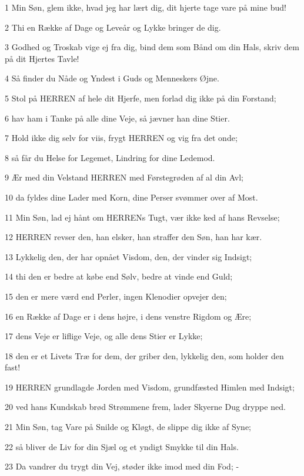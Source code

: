 \par 1 Min Søn, glem ikke, hvad jeg har lært dig, dit hjerte tage vare på mine bud!
\par 2 Thi en Række af Dage og Leveår og Lykke bringer de dig.
\par 3 Godhed og Troskab vige ej fra dig, bind dem som Bånd om din Hals, skriv dem på dit Hjertes Tavle!
\par 4 Så finder du Nåde og Yndest i Guds og Menneskers Øjne.
\par 5 Stol på HERREN af hele dit Hjerfe, men forlad dig ikke på din Forstand;
\par 6 hav ham i Tanke på alle dine Veje, så jævner han dine Stier.
\par 7 Hold ikke dig selv for viis, frygt HERREN og vig fra det onde;
\par 8 så får du Helse for Legemet, Lindring for dine Ledemod.
\par 9 Ær med din Velstand HERREN med Førstegrøden af al din Avl;
\par 10 da fyldes dine Lader med Korn, dine Perser svømmer over af Most.
\par 11 Min Søn, lad ej hånt om HERRENs Tugt, vær ikke ked af hans Revselse;
\par 12 HERREN revser den, han elsker, han straffer den Søn, han har kær.
\par 13 Lykkelig den, der har opnået Visdom, den, der vinder sig Indsigt;
\par 14 thi den er bedre at købe end Sølv, bedre at vinde end Guld;
\par 15 den er mere værd end Perler, ingen Klenodier opvejer den;
\par 16 en Række af Dage er i dens højre, i dens venstre Rigdom og Ære;
\par 17 dens Veje er liflige Veje, og alle dens Stier er Lykke;
\par 18 den er et Livets Træ for dem, der griber den, lykkelig den, som holder den fast!
\par 19 HERREN grundlagde Jorden med Visdom, grundfæsted Himlen med Indsigt;
\par 20 ved hans Kundskab brød Strømmene frem, lader Skyerne Dug dryppe ned.
\par 21 Min Søn, tag Vare på Snilde og Kløgt, de slippe dig ikke af Syne;
\par 22 så bliver de Liv for din Sjæl og et yndigt Smykke til din Hals.
\par 23 Da vandrer du trygt din Vej, støder ikke imod med din Fod; -
